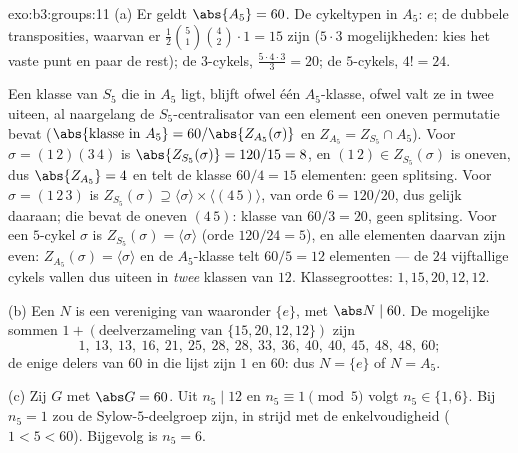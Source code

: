 \begin{solution}{exo:b3:groups:11}
(a) Er geldt $\abs{A_5} = 60$. De cykeltypen in $A_5$: $e$; de
dubbele transposities, waarvan er
$\frac{1}{2}\binom{5}{1}\binom{4}{2}\cdot 1 = 15$ zijn ($5 \cdot 3$
mogelijkheden: kies het vaste punt en paar de rest); de
$3$-cykels, $\frac{5 \cdot 4 \cdot 3}{3} = 20$; de $5$-cykels, $4!
= 24$.

Een klasse van $S_5$ die in $A_5$ ligt, blijft ofwel één
$A_5$-klasse, ofwel valt ze in twee uiteen, al naargelang de
$S_5$-centralisator van een element een oneven permutatie bevat
($\abs{\text{klasse in }A_5} = 60/\abs{Z_{A_5}(\sigma)}$ en
$Z_{A_5} = Z_{S_5} \cap A_5$). Voor $\sigma = (1\,2)(3\,4)$ is
$\abs{Z_{S_5}(\sigma)} = 120/15 = 8$, en $(1\,2) \in
Z_{S_5}(\sigma)$ is oneven, dus $\abs{Z_{A_5}} = 4$ en telt de
klasse $60/4 = 15$ elementen: geen splitsing. Voor $\sigma =
(1\,2\,3)$ is $Z_{S_5}(\sigma) \supseteq \langle \sigma \rangle
\times \langle (4\,5)\rangle$, van orde $6 = 120/20$, dus gelijk
daaraan; die bevat de oneven $(4\,5)$: klasse van $60/3 = 20$, geen
splitsing. Voor een $5$-cykel $\sigma$ is $Z_{S_5}(\sigma) =
\langle \sigma\rangle$ (orde $120/24 = 5$), en alle elementen
daarvan zijn even: $Z_{A_5}(\sigma) = \langle \sigma\rangle$ en de
$A_5$-klasse telt $60/5 = 12$ elementen --- de $24$ vijftallige
cykels vallen dus uiteen in \emph{twee} klassen van $12$.
Klassegroottes: $1, 15, 20, 12, 12$.

(b) Een  $N$ is een vereniging van 
waaronder $\{e\}$, met $\abs N \mid 60$. De mogelijke sommen $1 +
(\text{deelverzameling van } \{15, 20, 12, 12\})$ zijn
\[
1,\ 13,\ 13,\ 16,\ 21,\ 25,\ 28,\ 28,\ 33,\ 36,\ 40,\ 40,\ 45,\
48,\ 48,\ 60 ;
\]
de enige delers van $60$ in die lijst zijn $1$ en $60$: dus $N =
\{e\}$ of $N = A_5$.

(c) Zij $G$  met $\abs G = 60$. Uit $n_5 \mid 12$ en
$n_5 \equiv 1 \pmod 5$ volgt $n_5 \in \{1, 6\}$. Bij $n_5 = 1$ zou
de Sylow-$5$-deelgroep \omterm{def:b3:groups:normal}{normaal} zijn, in strijd met de
enkelvoudigheid ($1 < 5 < 60$). Bijgevolg is $n_5 = 6$.
\end{solution}

